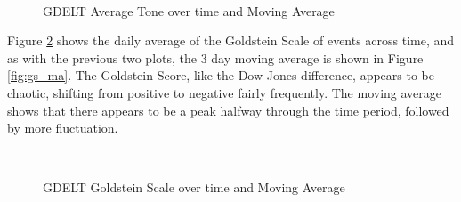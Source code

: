 \begin{figure}[H]
	\centering
	\\
	\caption{GDELT Average Tone over time and Moving Average}
	\label{fig:avg_tone_diff}
\end{figure}

Figure \ref{fig:gs_diff} shows the daily average of the Goldstein Scale of events across time, and as with the previous two plots, the 3 day moving average is shown in Figure \ref{fig:gs_ma}. The Goldstein Score, like the Dow Jones difference, appears to be chaotic, shifting from positive to negative fairly frequently. The moving average shows that there appears to be a peak halfway through the time period, followed by more fluctuation. 

\begin{figure}[H]
	\centering
	\\
	\caption{GDELT Goldstein Scale over time and Moving Average}
	\label{fig:gs_diff}
\end{figure}

